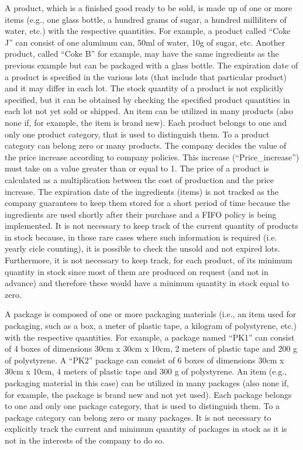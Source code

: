 A product, which is a finished good ready to be sold, is made up of one or more items (e.g., one glass bottle, a hundred grams of sugar, a hundred milliliters of water, etc.) with the respective quantities. For example, a product called ``Coke J'' can consist of one aluminum can, 50ml of water, 10g of sugar, etc. Another product, called ``Coke B'' for example, may have the same ingredients as the previous example but can be packaged with a glass bottle. The expiration date of a product is specified in the various lots (that include that particular product) and it may differ in each lot. The stock quantity of a product is not explicitly specified, but it can be obtained by checking the specified product quantities in each lot not yet sold or shipped. An item can be utilized in many products (also none if, for example, the item is brand new). Each product belongs to one and only one product category, that is used to distinguish them. To a product category can belong zero or many products. The company decides the value of the price increase according to company policies. This increase (``Price\_increase'') must take on a value greater than or equal to 1. The price of a product is calculated as a multiplication between the cost of production and the price increase. The expiration date of the ingredients (items) is not tracked as the company guarantees to keep them stored for a short period of time because the ingredients are used shortly after their purchase and a FIFO policy is being implemented. It is not necessary to keep track of the current quantity of products in stock because, in those rare cases where such information is required (i.e. yearly cicle counting), it is possible to check the unsold and not expired lots. Furthermore, it is not necessary to keep track, for each product, of its minimum quantity in stock since most of them are produced on request (and not in advance) and therefore these would have a minimum quantity in stock equal to zero.

A package is composed of one or more packaging materials (i.e., an item used for packaging, such as a box, a meter of plastic tape, a kilogram of polystyrene, etc.) with the respective quantities. For example, a package named ``PK1'' can consist of 4 boxes of dimensions 30cm x 30cm x 10cm, 2 meters of plastic tape and 200 g of polystyrene. A ``PK2'' package can consist of 6 boxes of dimensions 30cm x 30cm x 10cm, 4 meters of plastic tape and 300 g of polystyrene. An item (e.g., packaging material in this case) can be utilized in many packages (also none if, for example, the package is brand new and not yet used). Each package belongs to one and only one package category, that is used to distinguish them. To a package category can belong zero or many packages. It is not necessary to explicitly track the current and minimum quantity of packages in stock as it is not in the interests of the company to do so.


